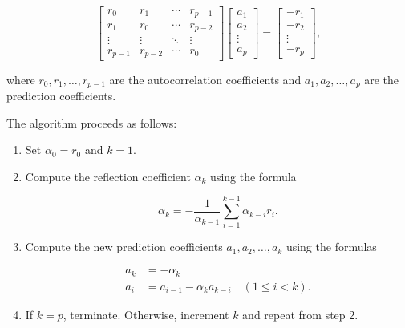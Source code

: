     \begin{equation*}
        \begin{bmatrix}
        r_0 & r_1 & \cdots & r_{p-1} \\
        r_1 & r_0 & \cdots & r_{p-2} \\
        \vdots & \vdots & \ddots & \vdots \\
        r_{p-1} & r_{p-2} & \cdots & r_0
        \end{bmatrix}
        \begin{bmatrix}
        a_1 \\
        a_2 \\
        \vdots \\
        a_p
        \end{bmatrix}
        =
        \begin{bmatrix}
        -r_1 \\
        -r_2 \\
        \vdots \\
        -r_p
        \end{bmatrix},
        \end{equation*}
        
        where $r_0, r_1, \ldots, r_{p-1}$ are the autocorrelation coefficients and $a_1, a_2, \ldots, a_p$ are the prediction coefficients.
        
        The algorithm proceeds as follows:
        
        \begin{enumerate}
        \item Set $\alpha_0 = r_0$ and $k = 1$.
        \item Compute the reflection coefficient $\alpha_k$ using the formula
        
        \begin{equation*}
        \alpha_k = -\frac{1}{\alpha_{k-1}} \sum_{i=1}^{k-1} \alpha_{k-i} r_i.
        \end{equation*}
        
        \item Compute the new prediction coefficients $a_1, a_2, \ldots, a_k$ using the formulas
        
        \begin{align*}
        a_k &= -\alpha_k \\
        a_i &= a_{i-1} - \alpha_k a_{k-i} \quad (1 \leq i < k).
        \end{align*}
        
        \item If $k = p$, terminate. Otherwise, increment $k$ and repeat from step 2.
        \end{enumerate}
        
